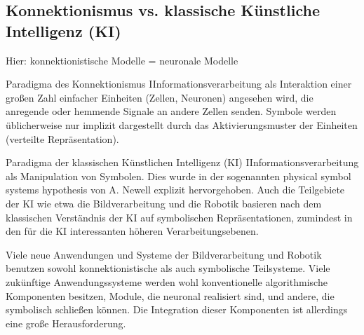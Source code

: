 \subsection{Konnektionismus vs. klassische Künstliche Intelligenz (KI)}
Hier: konnektionistische Modelle = neuronale Modelle
\begin{mytheo}{Paradigma des Konnektionismus}
IInformationsverarbeitung als
Interaktion einer großen Zahl einfacher Einheiten (Zellen, Neuronen) angesehen
wird, die anregende oder hemmende Signale an andere Zellen senden. Symbole
werden üblicherweise nur implizit dargestellt durch das Aktivierungsmuster der
Einheiten (verteilte Repräsentation).
\end{mytheo}
\begin{mytheo}{Paradigma der klassischen Künstlichen Intelligenz (KI)}
IInformationsverarbeitung als Manipulation von Symbolen. Dies wurde in der
sogenannten physical symbol systems hypothesis von A. Newell explizit
hervorgehoben. Auch die Teilgebiete der KI wie etwa die Bildverarbeitung und die
Robotik basieren nach dem klassischen Verständnis der KI auf symbolischen
Repräsentationen, zumindest in den für die KI interessanten höheren
Verarbeitungsebenen. 
\end{mytheo}
Viele neue Anwendungen
und Systeme der Bildverarbeitung und Robotik benutzen sowohl
konnektionistische als auch symbolische Teilsysteme.
Viele zukünftige Anwendungssysteme werden wohl konventionelle algorithmische
Komponenten besitzen, Module, die neuronal realisiert sind, und andere, die
symbolisch schließen können. Die Integration dieser Komponenten ist allerdings
eine große Herausforderung.
